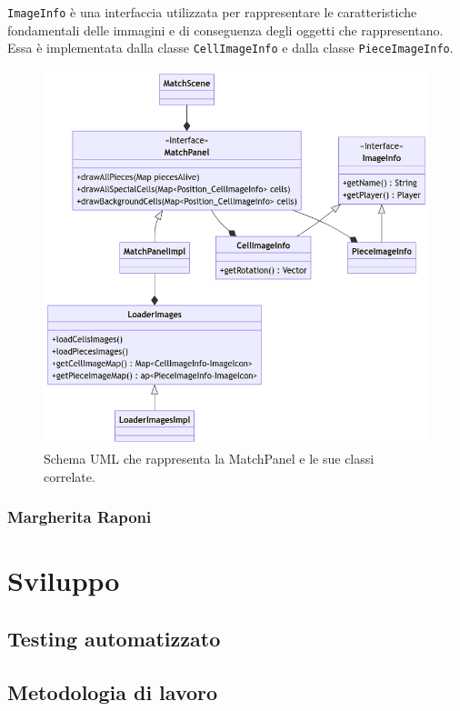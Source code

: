 \documentclass[a4paper,12pt]{report}
\begin{document}
\texttt{ImageInfo} è una interfaccia utilizzata per rappresentare le caratteristiche fondamentali delle immagini e di conseguenza degli oggetti 
che rappresentano. Essa è implementata dalla classe \texttt{CellImageInfo} e dalla classe \texttt{PieceImageInfo}.
\begin{figure}[H]
\centering
\includegraphics[width=\textwidth]{images/match-panel.png}
\caption{Schema UML che rappresenta la MatchPanel e le sue classi correlate.}
\label{images:match-panel}
\end{figure}
\subsection{Margherita Raponi}



\chapter{Sviluppo}


\section{Testing automatizzato}


\section{Metodologia di lavoro}
\end{document}
